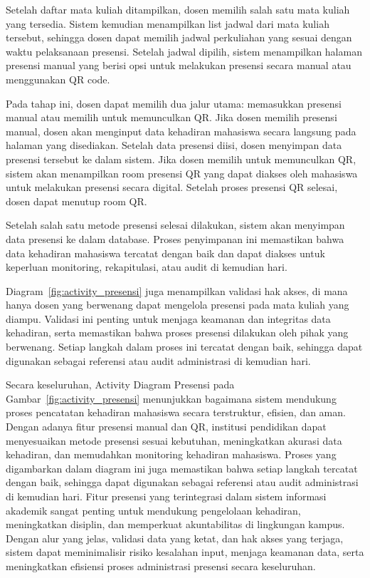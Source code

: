 \documentclass[a4paper,oneside,11pt]{book}
\begin{document}
Setelah daftar mata kuliah ditampilkan, dosen memilih salah satu mata kuliah yang tersedia. Sistem kemudian menampilkan list jadwal dari mata kuliah tersebut, sehingga dosen dapat memilih jadwal perkuliahan yang sesuai dengan waktu pelaksanaan presensi. Setelah jadwal dipilih, sistem menampilkan halaman presensi manual yang berisi opsi untuk melakukan presensi secara manual atau menggunakan QR code.

Pada tahap ini, dosen dapat memilih dua jalur utama: memasukkan presensi manual atau memilih untuk memunculkan QR. Jika dosen memilih presensi manual, dosen akan menginput data kehadiran mahasiswa secara langsung pada halaman yang disediakan. Setelah data presensi diisi, dosen menyimpan data presensi tersebut ke dalam sistem. Jika dosen memilih untuk memunculkan QR, sistem akan menampilkan room presensi QR yang dapat diakses oleh mahasiswa untuk melakukan presensi secara digital. Setelah proses presensi QR selesai, dosen dapat menutup room QR.

Setelah salah satu metode presensi selesai dilakukan, sistem akan menyimpan data presensi ke dalam database. Proses penyimpanan ini memastikan bahwa data kehadiran mahasiswa tercatat dengan baik dan dapat diakses untuk keperluan monitoring, rekapitulasi, atau audit di kemudian hari.

Diagram~\ref{fig:activity_presensi} juga menampilkan validasi hak akses, di mana hanya dosen yang berwenang dapat mengelola presensi pada mata kuliah yang diampu. Validasi ini penting untuk menjaga keamanan dan integritas data kehadiran, serta memastikan bahwa proses presensi dilakukan oleh pihak yang berwenang. Setiap langkah dalam proses ini tercatat dengan baik, sehingga dapat digunakan sebagai referensi atau audit administrasi di kemudian hari.

Secara keseluruhan, Activity Diagram Presensi pada Gambar~\ref{fig:activity_presensi} menunjukkan bagaimana sistem mendukung proses pencatatan kehadiran mahasiswa secara terstruktur, efisien, dan aman. Dengan adanya fitur presensi manual dan QR, institusi pendidikan dapat menyesuaikan metode presensi sesuai kebutuhan, meningkatkan akurasi data kehadiran, dan memudahkan monitoring kehadiran mahasiswa. Proses yang digambarkan dalam diagram ini juga memastikan bahwa setiap langkah tercatat dengan baik, sehingga dapat digunakan sebagai referensi atau audit administrasi di kemudian hari. Fitur presensi yang terintegrasi dalam sistem informasi akademik sangat penting untuk mendukung pengelolaan kehadiran, meningkatkan disiplin, dan memperkuat akuntabilitas di lingkungan kampus. Dengan alur yang jelas, validasi data yang ketat, dan hak akses yang terjaga, sistem dapat meminimalisir risiko kesalahan input, menjaga keamanan data, serta meningkatkan efisiensi proses administrasi presensi secara keseluruhan.
\end{document}

